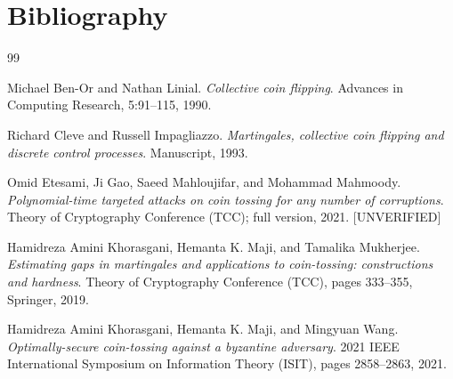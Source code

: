 \documentclass{aicr-conjecture}
\begin{document}
\section{Bibliography}

\begin{aicrbibliography}{99}

Michael Ben-Or and Nathan Linial.
\emph{Collective coin flipping}.
Advances in Computing Research, 5:91--115, 1990.

Richard Cleve and Russell Impagliazzo.
\emph{Martingales, collective coin flipping and discrete control
processes}.
Manuscript, 1993.

Omid Etesami, Ji Gao, Saeed Mahloujifar, and Mohammad Mahmoody.
\emph{Polynomial-time targeted attacks on coin tossing for any number of
corruptions}.
Theory of Cryptography Conference (TCC); full version, 2021. [UNVERIFIED]

Hamidreza Amini Khorasgani, Hemanta K. Maji, and Tamalika Mukherjee.
\emph{Estimating gaps in martingales and applications to coin-tossing:
constructions and hardness}.
Theory of Cryptography Conference (TCC), pages 333--355, Springer, 2019.

Hamidreza Amini Khorasgani, Hemanta K. Maji, and Mingyuan Wang.
\emph{Optimally-secure coin-tossing against a byzantine adversary}.
2021 IEEE International Symposium on Information Theory (ISIT), pages
2858--2863, 2021.

\end{aicrbibliography}
\end{document}
